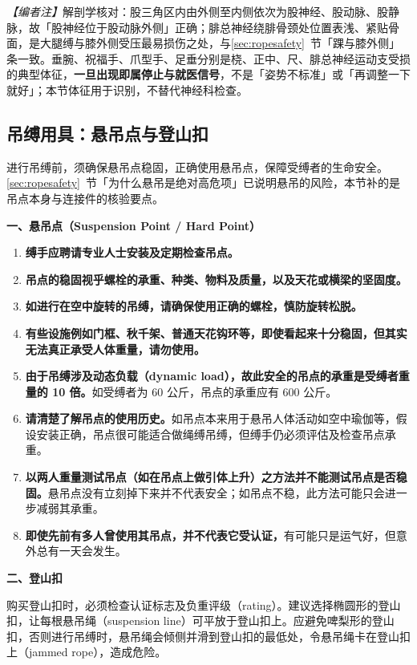 \documentclass[12pt,UTF8]{ctexbook}
\begin{document}
\noindent\textit{【编者注】}解剖学核对：股三角区内由外侧至内侧依次为股神经、股动脉、股静脉，故「股神经位于股动脉外侧」正确；腓总神经绕腓骨颈处位置表浅、紧贴骨面，是大腿缚与膝外侧受压最易损伤之处，与\ref{sec:ropesafety}~节「踝与膝外侧」条一致。垂腕、祝福手、爪型手、足垂分别是桡、正中、尺、腓总神经运动支受损的典型体征，\textbf{一旦出现即属停止与就医信号}，不是「姿势不标准」或「再调整一下就好」；本节体征用于识别，不替代神经科检查。

\subsection{吊缚用具：悬吊点与登山扣}\label{sec:ropehardware}

进行吊缚前，须确保悬吊点稳固，正确使用悬吊点，保障受缚者的生命安全。\ref{sec:ropesafety}~节「为什么悬吊是绝对高危项」已说明悬吊的风险，本节补的是吊点本身与连接件的核验要点。

\noindent\textbf{一、悬吊点（Suspension Point / Hard Point）}

\begin{enumerate}
\item \textbf{缚手应聘请专业人士安装及定期检查吊点。}
\item \textbf{吊点的稳固视乎螺栓的承重、种类、物料及质量，以及天花或横梁的坚固度。}
\item \textbf{如进行在空中旋转的吊缚，请确保使用正确的螺栓，慎防旋转松脱。}
\item \textbf{有些设施例如门框、秋千架、普通天花钩环等，即使看起来十分稳固，但其实无法真正承受人体重量，请勿使用。}
\item \textbf{由于吊缚涉及动态负载（dynamic load），故此安全的吊点的承重是受缚者重量的 10 倍。}如受缚者为 60 公斤，吊点的承重应有 600 公斤。
\item \textbf{请清楚了解吊点的使用历史。}如吊点本来用于悬吊人体活动如空中瑜伽等，假设安装正确，吊点很可能适合做绳缚吊缚，但缚手仍必须评估及检查吊点承重。
\item \textbf{以两人重量测试吊点（如在吊点上做引体上升）之方法并不能测试吊点是否稳固。}悬吊点没有立刻掉下来并不代表安全；如吊点不稳，此方法可能只会进一步减弱其承重。
\item \textbf{即使先前有多人曾使用其吊点，并不代表它受认证，}有可能只是运气好，但意外总有一天会发生。
\end{enumerate}

\noindent\textbf{二、登山扣}

购买登山扣时，必须检查认证标志及负重评级（rating）。建议选择椭圆形的登山扣，让每根悬吊绳（suspension line）可平放于登山扣上。应避免啤梨形的登山扣，否则进行吊缚时，悬吊绳会倾侧并滑到登山扣的最低处，令悬吊绳卡在登山扣上（jammed rope），造成危险。
\end{document}
